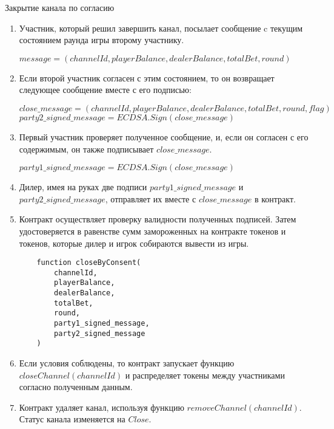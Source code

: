 \begin{algorithm}
\caption{Закрытие канала по согласию} \label{alg:close1}
\begin{enumerate}
	\item Участник, который решил завершить канал, посылает сообщение c текущим состоянием раунда игры второму участнику.
\begin{center}
$message = (channelId, playerBalance, dealerBalance, totalBet, round)$
\end{center} 
	\item Если второй участник согласен с этим состоянием, то он возвращает следующее сообщение вместе с его подписью:
\begin{center}
$close\_message = (channelId, playerBalance, dealerBalance, totalBet, round, flag)$\\
$party2\_signed\_message = ECDSA.Sign(close\_message)$
\end{center}
	\item Первый участник проверяет полученное сообщение, и, если он согласен с его содержимым, он также подписывает $close\_message$.
\begin{center}
$party1\_signed\_message = ECDSA.Sign(close\_message)$
\end{center}
	\item Дилер, имея на руках две подписи $party1\_signed\_message$ и $party2\_signed\_message$, отправляет их вместе с $close\_message$ в контракт. \label{deal_sig}
	\item Контракт осуществляет проверку валидности полученных подписей. Затем удостоверяется в равенстве сумм замороженных на контракте токенов и токенов, которые дилер и игрок собираются вывести из игры.
\begin{lstlisting}
    function closeByConsent(
        channelId,
        playerBalance,
        dealerBalance,
        totalBet,
        round,
        party1_signed_message,
        party2_signed_message 
    )
\end{lstlisting}
\end{enumerate}
\end{algorithm}

\begin{algorithm}
\begin{enumerate}
\setcounter{enumi}{5}
	\item Если условия соблюдены, то контракт запускает функцию $closeChannel(channelId)$  и распределяет токены между участниками согласно полученным данным.
	\item Контракт удаляет канал, используя функцию $removeChannel(channelId)$. Статус канала изменяется на $Close$.
\end{enumerate}
\end{algorithm}



